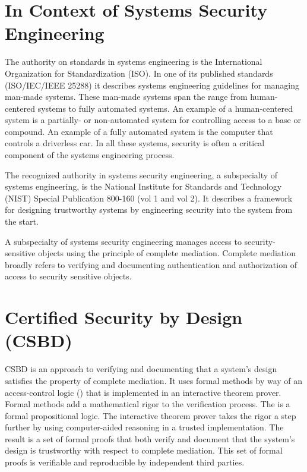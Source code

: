 \documentclass[../../main/main.tex]{subfiles}
\begin{document}
\section{In Context of Systems Security Engineering}\label{sec:intro:motivation}
The authority on standards in systems engineering is the International Organization for Standardization (ISO).  In one of its published standards (ISO/IEC/IEEE 25288) it describes systems engineering guidelines for managing man-made systems.  These man-made systems span the range from human-centered systems to fully automated systems.  An example of a human-centered system is a partially- or non-automated system for controlling access to a base or compound.  An example of a fully automated system is the computer that controls a driverless car.  In all these systems, security is often a critical component of the systems engineering process.


The recognized authority in systems security engineering, a subspecialty of systems engineering, is the National Institute for Standards and Technology (NIST) Special Publication 800-160 (vol 1 and vol 2).  It describes a framework for designing trustworthy systems by engineering security into the system from the start.  

A subspecialty of systems security engineering manages access to security-sensitive objects using the principle of complete mediation.  Complete mediation broadly refers to verifying and documenting authentication and authorization of access to security sensitive objects. 


\section{Certified Security by Design (CSBD)}\label{sec:intro:motivation}
CSBD is an approach to verifying and documenting that a system's design satisfies the property of complete mediation. It uses formal methods by way of an access-control logic () that is implemented in an interactive theorem prover.  Formal methods add a mathematical rigor to the verification process.  The  is a formal propositional logic.  The interactive theorem prover takes the rigor a step further by using computer-aided reasoning in a trusted implementation.   The result is a set of formal proofs that both verify and document that the system's design is trustworthy with respect to complete mediation.  This set of formal proofs is verifiable and reproducible by independent third parties. 
\end{document}
